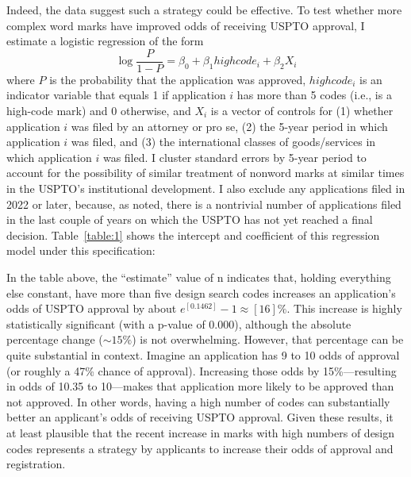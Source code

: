 \documentclass[letterpaper, 11pt, oneside]{article}
\begin{document}
Indeed, the data suggest such a strategy could be effective. To test whether more complex word marks have improved odds of receiving USPTO approval, I estimate a logistic regression of the form \
\begin{equation}
\log{\frac{P}{1-P}}=\beta_0+\beta_1highcode_i+\beta_2X_i
\end{equation}
where $P$ is the probability that the application was approved, $highcode_i$ is an indicator variable that equals 1 if application $i$ has more than 5 codes (i.e., is a high-code mark) and 0 otherwise, and $X_i$ is a vector of controls for (1) whether application $i$ was filed by an attorney or pro se, (2) the 5-year period in which application $i$ was filed, and (3) the international classes of goods/services in which application $i$ was filed. I cluster standard errors by 5-year period to account for the possibility of similar treatment of nonword marks at similar times in the USPTO's institutional development. I also exclude any applications filed in 2022 or later, because, as noted, there is a nontrivial number of applications filed in the last couple of years on which the USPTO has not yet reached a final decision. Table~\ref{table:1} shows the intercept and coefficient of this regression model under this specification:

 \par

\noindent In the table above, the ``estimate'' value of n indicates that, holding everything else constant, have more than five design search codes increases an application's odds of USPTO approval by about $e^[0.1462]-1 \approx [16]\%$. This increase is highly statistically significant (with a p-value of 0.000), although the absolute percentage change ($\sim15\%$) is not overwhelming. However, that percentage can be quite substantial in context. Imagine an application has 9 to 10 odds of approval (or roughly a 47\% chance of approval). Increasing those odds by 15\%—resulting in odds of 10.35 to 10—makes that application more likely to be approved than not approved. In other words, having a high number of codes can substantially better an applicant's odds of receiving USPTO approval. Given these results, it at least plausible that the recent increase in marks with high numbers of design codes represents a strategy by applicants to increase their odds of approval and registration. 
\end{document}
